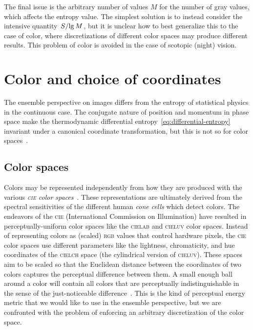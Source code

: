 \documentclass[aps,reprint,floatfix]{revtex4-2}
\renewcommand\mathrm\textnormal%
\theoremstyle{plain}
\theoremstyle{definition}
\renewcommand\lg{\operatorname{\mathrm{lg}}}
\begin{document}
The final issue is the arbitrary number of values $M$ for the number of gray
values, which affects the entropy value. The simplest solution is to instead
consider the intensive quantity $\flatfrac{S}{\lg M}$, but it is unclear how to
best generalize this to the case of color, where discretizations of different
color spaces may produce different results. This problem of color is avoided in
the case of scotopic (night) vision.

\section{Color and choice of coordinates}\label{sec:color}

The ensemble perspective on images differs from the entropy of statistical
physics in the continuous case. The conjugate nature of position and momentum in
phase space make the thermodynamic differential entropy~\eqref{eq:differential-entropy}
invariant under a canonical coordinate transformation, but this is not so for
color spaces~\cite{diffvar}.

\subsection{Color spaces}

Colors may be represented independently from how they are produced with the
various \emph{\textsc{cie} color spaces}~\cite{cie}. These representations are
ultimately derived from the spectral sensitivities of the different human
\emph{cone cells} which detect colors. The endeavors of the \textsc{cie}
(International Commission on Illumination) have resulted in perceptually-uniform
color spaces like the \textsc{cielab} and \textsc{cieluv} color spaces. Instead
of representing colors as (scaled) \textsc{rgb} values that control hardware
pixels, the \textsc{cie} color spaces use different parameters like the
lightness, chromaticity, and hue coordinates of the \textsc{cielch} space (the
cylindrical version of \textsc{cieluv}). These spaces aim to be scaled so that
the Euclidean distance between the coordinates of two colors captures the
perceptual difference between them. A small enough ball around a color will
contain all colors that are perceptually indistinguishable in the sense of the
just-noticeable difference~\cite{jnd}. This is the kind of perceptual energy
metric that we would like to use in the ensemble perspective, but we are
confronted with the problem of enforcing an arbitrary discretization of the
color space.
\end{document}
